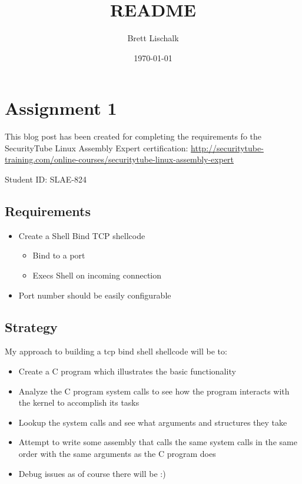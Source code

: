 \documentclass[11pt]{article}
\author{Brett Lischalk}
\date{\today}
\title{README}
\begin{document}
\maketitle
\tableofcontents

\section{Assignment 1}
\label{sec-1}

This blog post has been created for completing the requirements fo the SecurityTube
Linux Assembly Expert certification:
\href{http://securitytube-training.com/online-courses/securitytube-linux-assembly-expert}{\url{http://securitytube-training.com/online-courses/securitytube-linux-assembly-expert}}

Student ID: SLAE-824

\subsection{Requirements}
\label{sec-1-1}

\begin{itemize}
\item Create a Shell Bind TCP shellcode
\begin{itemize}
\item Bind to a port
\item Execs Shell on incoming connection
\end{itemize}
\item Port number should be easily configurable
\end{itemize}

\subsection{Strategy}
\label{sec-1-2}

My approach to building a tcp bind shell shellcode will be to:

\begin{itemize}
\item Create a C program which illustrates the basic functionality
\item Analyze the C program system calls to see how the program interacts with the kernel to accomplish its tasks
\item Lookup the system calls and see what arguments and structures they take
\item Attempt to write some assembly that calls the same system calls in the same order with the same arguments as the C program does
\item Debug issues as of course there will be :)
\end{itemize}
\end{document}
